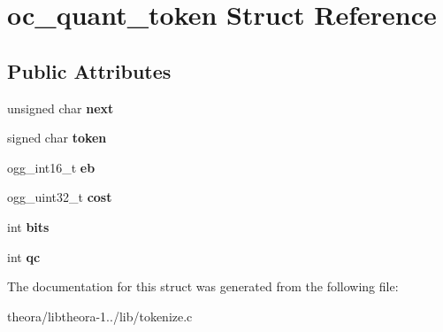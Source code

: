 \hypertarget{structoc__quant__token}{\section{oc\+\_\+quant\+\_\+token Struct Reference}
\label{structoc__quant__token}
}
\subsection*{Public Attributes}
\begin{DoxyCompactItemize}
\item 
\hypertarget{structoc__quant__token_a24cafba19ee33b7cb92a21826a065930}{unsigned char {\bfseries next}}\label{structoc__quant__token_a24cafba19ee33b7cb92a21826a065930}

\item 
\hypertarget{structoc__quant__token_a56903791ae41c9580eead30cae29c54f}{signed char {\bfseries token}}\label{structoc__quant__token_a56903791ae41c9580eead30cae29c54f}

\item 
\hypertarget{structoc__quant__token_a53d2bb0d4c49e9c1bb07bac15b691b22}{ogg\+\_\+int16\+\_\+t {\bfseries eb}}\label{structoc__quant__token_a53d2bb0d4c49e9c1bb07bac15b691b22}

\item 
\hypertarget{structoc__quant__token_ad0749b028bb9ccd539341b5d13f81a3d}{ogg\+\_\+uint32\+\_\+t {\bfseries cost}}\label{structoc__quant__token_ad0749b028bb9ccd539341b5d13f81a3d}

\item 
\hypertarget{structoc__quant__token_a77e83cc3c40cbe42adfda0f55b7129ee}{int {\bfseries bits}}\label{structoc__quant__token_a77e83cc3c40cbe42adfda0f55b7129ee}

\item 
\hypertarget{structoc__quant__token_aee1abcdffe627a39484e4570ca198907}{int {\bfseries qc}}\label{structoc__quant__token_aee1abcdffe627a39484e4570ca198907}

\end{DoxyCompactItemize}


The documentation for this struct was generated from the following file\+:\begin{DoxyCompactItemize}
\item 
theora/libtheora-\/1../lib/tokenize.\+c\end{DoxyCompactItemize}
